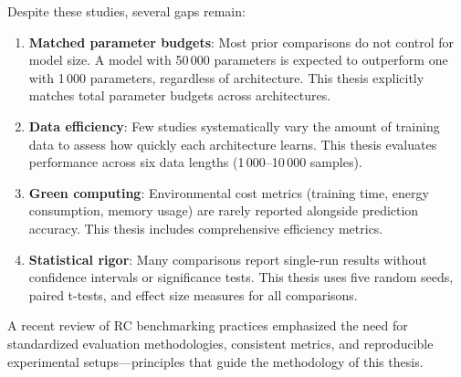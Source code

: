 Despite these studies, several gaps remain:
\begin{enumerate}
    \item \textbf{Matched parameter budgets}: Most prior comparisons do not control for model size. A model with 50\,000 parameters is expected to outperform one with 1\,000 parameters, regardless of architecture. This thesis explicitly matches total parameter budgets across architectures.
    \item \textbf{Data efficiency}: Few studies systematically vary the amount of training data to assess how quickly each architecture learns. This thesis evaluates performance across six data lengths (1\,000--10\,000 samples).
    \item \textbf{Green computing}: Environmental cost metrics (training time, energy consumption, memory usage) are rarely reported alongside prediction accuracy. This thesis includes comprehensive efficiency metrics.
    \item \textbf{Statistical rigor}: Many comparisons report single-run results without confidence intervals or significance tests. This thesis uses five random seeds, paired t-tests, and effect size measures for all comparisons.
\end{enumerate}

A recent review of RC benchmarking practices \cite{wringe2025benchmarks} emphasized the need for standardized evaluation methodologies, consistent metrics, and reproducible experimental setups---principles that guide the methodology of this thesis.
